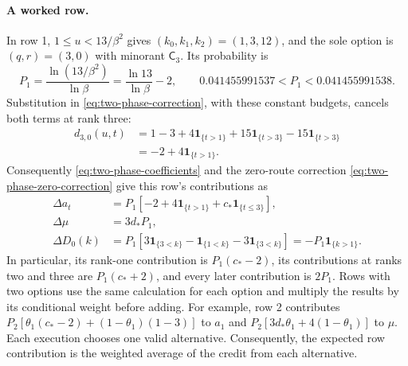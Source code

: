 \paragraph{A worked row.}
In row 1, $1\le u<13/\beta^2$ gives
$(k_0,k_1,k_2)=(1,3,12)$, and the sole option is
$(q,r)=(3,0)$ with minorant $\mathsf C_3$.
Its probability is
\[
 P_1=\frac{\ln(13/\beta^2)}{\ln\beta}
       =\frac{\ln13}{\ln\beta}-2,
 \qquad 0.041455991537<P_1<0.041455991538.
\]
Substitution in \eqref{eq:two-phase-correction}, with these constant
budgets, cancels both terms at rank
three:
\[
 \begin{aligned}
 d_{3,0}(u,t)
 &=1-3+4\mathbf1_{\{t>1\}}
       +15\mathbf1_{\{t>3\}}-15\mathbf1_{\{t>3\}}\\
 &=-2+4\mathbf1_{\{t>1\}}.
 \end{aligned}
\]
Consequently \eqref{eq:two-phase-coefficients} and the zero-route
correction \eqref{eq:two-phase-zero-correction} give this row's
contributions as
\[
 \begin{aligned}
 \Delta a_t&=P_1\left[-2+4\mathbf1_{\{t>1\}}
                         +c_*\mathbf1_{\{t\le3\}}\right],\\
 \Delta\mu&=3d_*P_1,\\
 \Delta D_0(k)&=P_1\left[3\mathbf1_{\{3<k\}}
                 -\mathbf1_{\{1<k\}}-3\mathbf1_{\{3<k\}}\right]
                 =-P_1\mathbf1_{\{k>1\}}.
 \end{aligned}
\]
In particular, its rank-one contribution is
$P_1(c_*-2)$, its contributions at ranks two and three are
$P_1(c_*+2)$, and every later contribution is $2P_1$.
Rows with two options use the same calculation for each option
and multiply the results by its conditional weight before adding.
For example, row 2 contributes
$P_2[\theta_1(c_*-2)+(1-\theta_1)(1-3)]$ to $a_1$ and
$P_2[3d_*\theta_1+4(1-\theta_1)]$ to $\mu$.
Each execution chooses one valid alternative. Consequently, the
expected row contribution is the weighted average of the credit from
each alternative.
